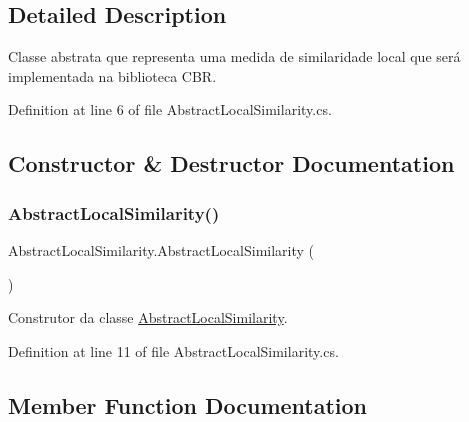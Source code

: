 \subsection{Detailed Description}
Classe abstrata que representa uma medida de similaridade local que será implementada na biblioteca C\+BR. 



Definition at line 6 of file Abstract\+Local\+Similarity.\+cs.



\subsection{Constructor \& Destructor Documentation}
\hypertarget{class_abstract_local_similarity_a211b136bd5cd1525f3e4637868252696}{}\label{class_abstract_local_similarity_a211b136bd5cd1525f3e4637868252696} 
\subsubsection{\texorpdfstring{Abstract\+Local\+Similarity()}{AbstractLocalSimilarity()}}
{\footnotesize\ttfamily Abstract\+Local\+Similarity.\+Abstract\+Local\+Similarity (\begin{DoxyParamCaption}{ }\end{DoxyParamCaption})}



Construtor da classe \hyperlink{class_abstract_local_similarity}{Abstract\+Local\+Similarity}. 



Definition at line 11 of file Abstract\+Local\+Similarity.\+cs.



\subsection{Member Function Documentation}
\hypertarget{class_abstract_local_similarity_a6c51b1fe09e99d509da0d3634225ca36}{}\label{class_abstract_local_similarity_a6c51b1fe09e99d509da0d3634225ca36} 
